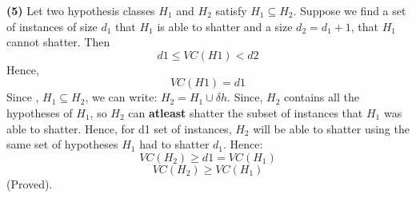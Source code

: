 \documentclass{article}
\renewcommand\part[1]{\vspace{.10in}\textbf{(#1)}}
\begin{document}
 \part{5} 
 Let two hypothesis classes $H_{1}$ and $H_{2}$ satisfy $H_{1} \subseteq H_{2}$. \newline
 Suppose we find a set of instances of size $d_{1}$ that $H_{1}$ is able to shatter and a size $d_{2}=d_{1}+1$, that $H_{1}$ cannot shatter. Then \newline
 \[ d1 \leq VC(H1) < d2 \]
 Hence,
\[ VC(H1) = d1 \]
 Since , $H_{1} \subseteq H_{2}$, we can write:  $H_{2} = H_{1} \cup \delta h$. \newline
 Since, $H_{2}$ contains all the hypotheses of $H_{1}$, so $H_{2}$ can \textbf {atleast} shatter the subset of instances that $H_{1}$ was able to shatter. Hence, for d1 set of instances, $H_{2}$ will be able to shatter using the same set of hypotheses $H_{1}$ had to shatter $d_{1}$. Hence: \newline
 \[ VC(H_{2}) \geq d1 = VC(H_{1}) \]
 \begin{equation}
  VC(H_{2}) \geq VC(H_{1})
 \end{equation}
 (Proved).\newline
\end{document}
